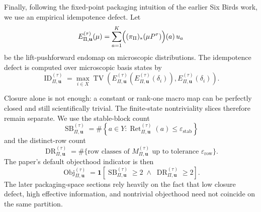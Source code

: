 \documentclass[11pt]{article}
\theoremstyle{definition}
\begin{document}
Finally, following the fixed-point packaging intuition of the earlier Six Birds work, we use an empirical idempotence defect. Let
\[
E_{\Pi,\mathbf{u}}^{(\tau)}(\mu)
=
\sum_{a=1}^{K}
\Bigl((\pi_{\Pi})_{*}(\mu P^{\tau})\Bigr)(a)\,u_{a}
\]
be the lift-pushforward endomap on microscopic distributions. The idempotence defect is computed over microscopic basis states by
\begin{equation}\label{eq:idempotence_defect}
\operatorname{ID}_{\Pi,\mathbf{u}}^{(\tau)}
=
\max_{i\in X}
\operatorname{TV}\!\left(
E_{\Pi,\mathbf{u}}^{(\tau)}\!\left(E_{\Pi,\mathbf{u}}^{(\tau)}(\delta_{i})\right),
E_{\Pi,\mathbf{u}}^{(\tau)}(\delta_{i})
\right).
\end{equation}

Closure alone is not enough: a constant or rank-one macro map can be perfectly closed and still scientifically trivial. The finite-state nontriviality slices therefore remain separate. We use the stable-block count
\[
\operatorname{SB}_{\Pi,\mathbf{u}}^{(\tau)}
=
\#\left\{
a\in Y :
\operatorname{Ret}_{\Pi,\mathbf{u}}^{(\tau)}(a)\le \varepsilon_{\mathrm{stab}}
\right\}
\]
and the distinct-row count
\[
\operatorname{DR}_{\Pi,\mathbf{u}}^{(\tau)}
=
\#\{\text{row classes of }M_{\Pi,\mathbf{u}}^{(\tau)} \text{ up to tolerance } \varepsilon_{\mathrm{row}}\}.
\]
The paper's default objecthood indicator is then
\begin{equation}\label{eq:nontrivial_object}
\operatorname{Obj}_{\Pi,\mathbf{u}}^{(\tau)}
=
\mathbf{1}\!\left[
\operatorname{SB}_{\Pi,\mathbf{u}}^{(\tau)}\ge 2
\;\wedge\;
\operatorname{DR}_{\Pi,\mathbf{u}}^{(\tau)}\ge 2
\right].
\end{equation}
The later packaging-space sections rely heavily on the fact that low closure defect, high effective information, and nontrivial objecthood need not coincide on the same partition.
\end{document}
